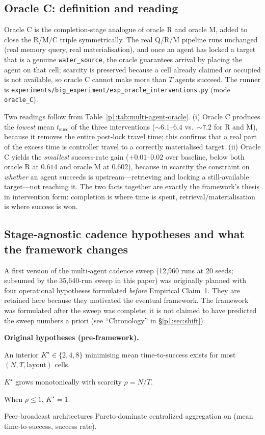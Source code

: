 \documentclass{article}
\newcommand{\method}[1]{\texttt{#1}}
\begin{document}
\subsection{Oracle C: definition and reading}
\label{p1:app:oracle-c-def}

Oracle C is the completion-stage analogue of oracle R and oracle M, added to close the R/M/C triple symmetrically. The real Q/R/M pipeline runs unchanged (real memory query, real materialisation), and once an agent has locked a target that is a genuine \texttt{water\_source}, the oracle guarantees arrival by placing the agent on that cell; scarcity is preserved because a cell already claimed or occupied is not available, so oracle C cannot make more than $T$ agents succeed. The runner is \method{experiments/big\_experiment/exp\_oracle\_interventions.py} (mode \method{oracle\_C}).

Two readings follow from Table~\ref{p1:tab:multi-agent-oracle}. (i) Oracle C produces the \emph{lowest} mean $t_{\mathrm{succ}}$ of the three interventions ($\sim6.1$--$6.4$ vs.\ $\sim7.2$ for R and M), because it removes the entire post-lock travel time; this confirms that a real part of the excess time is controller travel to a correctly materialised target. (ii) Oracle C yields the \emph{smallest} success-rate gain ($+0.01$--$0.02$ over baseline, below both oracle R at $0.614$ and oracle M at $0.602$), because in scarcity the constraint on \emph{whether} an agent succeeds is upstream---retrieving and locking a still-available target---not reaching it. The two facts together are exactly the framework's thesis in intervention form: completion is where time is spent, retrieval/materialisation is where success is won.

\subsection{Stage-agnostic cadence hypotheses and what the framework changes}
\label{p1:app:standalone-hypotheses}

A first version of the multi-agent cadence sweep (12{,}960 runs at 20 seeds; subsumed by the 35{,}640-run sweep in this paper) was originally planned with four operational hypotheses formulated \emph{before} Empirical Claim~1. They are retained here because they motivated the eventual framework. The framework was formulated after the sweep was complete; it is not claimed to have predicted the sweep numbers a priori (see ``Chronology'' in \S\ref{p1:sec:shift}).

\textbf{Original hypotheses (pre-framework).}
\begin{description}[leftmargin=10pt,topsep=2pt,itemsep=1pt]
\item[H1.] An interior $K^\star \in \{2,4,8\}$ minimising mean time-to-success exists for most $(N, T, \text{layout})$ cells.
\item[H2.] $K^\star$ grows monotonically with scarcity $\rho = N/T$.
\item[H3.] When $\rho \le 1$, $K^\star = 1$.
\item[H4.] Peer-broadcast architectures Pareto-dominate centralized aggregation on (mean time-to-success, success rate).
\end{description}
\end{document}
